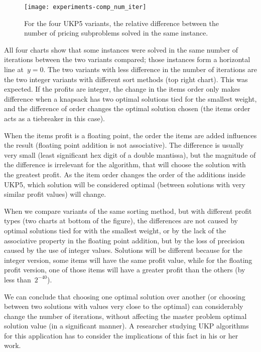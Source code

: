 \begin{figure}[h]
\caption{For the four UKP5 variants, the relative difference between the number of pricing subproblems solved in the same instance.}
\begin{center}
\texttt{[image: experiments-comp\_num\_iter]}
\end{center}
\label{fig:comp_num_iter}
\end{figure}

All four charts show that some instances were solved in the same number of iterations between the two variants compared; those instances form a horizontal line at~\(y = 0\).
The two variants with less difference in the number of iterations are the two integer variants with different sort methods (top right chart).
This was expected.
If the profits are integer, the change in the items order only makes difference when a knapsack has two optimal solutions tied for the smallest weight, and the difference of order changes the optimal solution chosen (the items order acts as a tiebreaker in this case).

When the items profit is a floating point, the order the items are added influences the result (floating point addition is not associative).
The difference is usually very small (least significant hex digit of a double mantissa), but the magnitude of the difference is irrelevant for the algorithm, that will choose the solution with the greatest profit.
As the item order changes the order of the additions inside UKP5, which solution will be considered optimal (between solutions with very similar profit values) will change.

When we compare variants of the same sorting method, but with different profit types (two charts at bottom of the figure), the differences are not caused by optimal solutions tied for with the smallest weight, or by the lack of the associative property in the floating point addition, but by the loss of precision caused by the use of integer values.
Solutions will be different because for the integer version, some items will have the same profit value, while for the floating profit version, one of those items will have a greater profit than the others (by less than~\(2^{-40}\)).

We can conclude that choosing one optimal solution over another (or choosing between two solutions with values very close to the optimal) can considerably change the number of iterations, without affecting the master problem optimal solution value (in a significant manner).
A researcher studying UKP algorithms for this application has to consider the implications of this fact in his or her work.%

